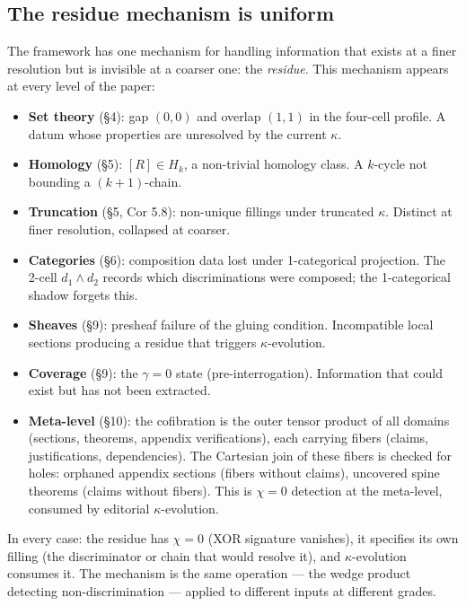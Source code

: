 \subsection{The residue mechanism is uniform}
\label{sec:residue-uniform}

The framework has one mechanism for handling information
that exists at a finer resolution but is invisible at a
coarser one: the \emph{residue}. This mechanism appears
at every level of the paper:

\begin{itemize}[nosep]
  \item \textbf{Set theory} (\S4): gap $(0,0)$ and overlap
    $(1,1)$ in the four-cell profile. A datum whose
    properties are unresolved by the current $\kappa$.
  \item \textbf{Homology} (\S5): $[R] \in H_k$,
    a non-trivial homology class. A $k$-cycle not
    bounding a $(k+1)$-chain.
  \item \textbf{Truncation} (\S5, Cor 5.8): non-unique
    fillings under truncated $\kappa$. Distinct at
    finer resolution, collapsed at coarser.
  \item \textbf{Categories} (\S6): composition data
    lost under 1-categorical projection. The 2-cell
    $d_1 \wedge d_2$ records which discriminations were
    composed; the 1-categorical shadow forgets this.
  \item \textbf{Sheaves} (\S9): presheaf failure of
    the gluing condition. Incompatible local sections
    producing a residue that triggers $\kappa$-evolution.
  \item \textbf{Coverage} (\S9): the $\gamma = 0$ state
    (pre-interrogation). Information that could exist
    but has not been extracted.
  \item \textbf{Meta-level} (\S10): the cofibration is
    the outer tensor product of all domains (sections,
    theorems, appendix verifications), each carrying
    fibers (claims, justifications, dependencies). The
    Cartesian join of these fibers is checked for holes:
    orphaned appendix sections (fibers without claims),
    uncovered spine theorems (claims without fibers).
    This is $\chi = 0$ detection at the meta-level,
    consumed by editorial $\kappa$-evolution.
\end{itemize}

In every case: the residue has $\chi = 0$ (XOR signature
vanishes), it specifies its own filling (the discriminator
or chain that would resolve it), and $\kappa$-evolution
consumes it. The mechanism is the same operation ---
the wedge product detecting non-discrimination ---
applied to different inputs at different grades.


